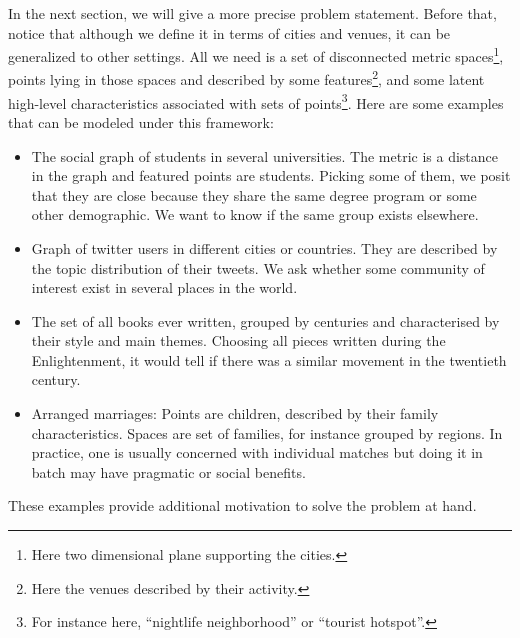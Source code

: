 In the next section, we will give a more precise problem statement. Before
that, notice that although we define it in terms of cities and venues, it can
be generalized to other settings. All we need is a set of disconnected metric
spaces\footnote{Here two dimensional plane supporting the cities.}, points
lying in those spaces and described by some features\footnote{Here the venues
described by their activity.}, and some latent high-level characteristics
associated with sets of points\footnote{For instance here, \enquote{nightlife
neighborhood} or \enquote{tourist hotspot}.}. Here are some examples that
can be modeled under this framework:
\begin{itemize}
	\item The social graph of students in several universities. The metric
		is a distance in the graph and featured points are students.
		Picking some of them, we posit that they are close because
		they share the same degree program or some other demographic.
		We want to know if the same group exists elsewhere.
	\item Graph of twitter users in different cities or countries. They
		are described by the topic distribution of their tweets. We
		ask whether some community of interest exist in several places
		in the world.
	\item The set of all books ever written, grouped by centuries and
		characterised by their style and main themes. Choosing all
		pieces written during the Enlightenment, it would tell if
		there was a similar movement in the twentieth century.
	\item Arranged marriages: Points are children, described by their family
		characteristics. Spaces are set of families, for instance grouped by
		regions. In practice, one is usually concerned with individual matches
		 but doing it in batch may have pragmatic or social
		benefits.
\end{itemize}

These examples provide additional motivation to solve the problem at hand.
